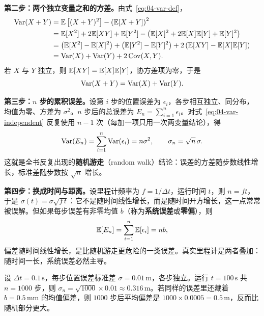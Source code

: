 \textbf{第二步：两个独立变量之和的方差。}由式~\eqref{eq:04-var-def}，
\begin{align}
  \operatorname{Var}(X+Y)
  &= \mathbb{E}\left[(X+Y)^{2}\right] - \left(\mathbb{E}[X+Y]\right)^{2} \notag\\
  &= \mathbb{E}[X^{2}]+2\mathbb{E}[XY]+\mathbb{E}[Y^{2}]
     - \left(\mathbb{E}[X]^{2}+2\mathbb{E}[X]\mathbb{E}[Y]+\mathbb{E}[Y]^{2}\right) \notag\\
  &= \left(\mathbb{E}[X^{2}]-\mathbb{E}[X]^{2}\right) + \left(\mathbb{E}[Y^{2}]-\mathbb{E}[Y]^{2}\right)
     + 2\left(\mathbb{E}[XY]-\mathbb{E}[X]\mathbb{E}[Y]\right) \notag\\
  &= \operatorname{Var}(X)+\operatorname{Var}(Y)+2\operatorname{Cov}(X,Y).
  \label{eq:04-var-sum}
\end{align}
若 $X$ 与 $Y$ 独立，则 $\mathbb{E}[XY]=\mathbb{E}[X]\mathbb{E}[Y]$，协方差项为零，于是
\begin{equation}
  \operatorname{Var}(X+Y)=\operatorname{Var}(X)+\operatorname{Var}(Y).
  \label{eq:04-var-independent}
\end{equation}

\textbf{第三步：$n$ 步的累积误差。}设第 $i$ 步的位置误差为 $\epsilon_i$，各步相互独立、同分布，均值为零、方差为 $\sigma^{2}$。$n$ 步后的总误差为 $E_n=\sum_{i=1}^{n}\epsilon_i$。对式~\eqref{eq:04-var-independent} 反复使用 $n-1$ 次（每加一项只用一次两变量结论），得
\begin{equation}
  \operatorname{Var}(E_n) = \sum_{i=1}^{n}\operatorname{Var}(\epsilon_i) = n\sigma^{2},
  \qquad
  \sigma_{n} = \sqrt{n}\,\sigma.
  \label{eq:04-drift-var}
\end{equation}
这就是全书反复出现的\textbf{随机游走}（random walk）结论：误差的方差随步数线性增长，标准差随步数按 $\sqrt{n}$ 增长。

\textbf{第四步：换成时间与距离。}设里程计频率为 $f=1/\Delta t$，运行时间 $t$，则 $n=ft$，于是 $\sigma(t)=\sigma\sqrt{f\,t}$：它不是随时间线性增长，而是随时间开方增长，这一点常常被误解。但如果每步误差有非零均值 $b$（称为\textbf{系统误差}或\textbf{零偏}），则
\begin{equation}
  \mathbb{E}[E_n] = \sum_{i=1}^{n}\mathbb{E}[\epsilon_i] = nb,
  \label{eq:04-bias}
\end{equation}
偏差随时间线性增长，是比随机游走更危险的一类误差。真实里程计是两者叠加：随时间一长，系统误差必然主导。

\begin{example}
设 $\Delta t=0.1\,\mathrm{s}$，每步位置误差标准差 $\sigma=0.01\,\mathrm{m}$，各步独立。运行 $t=100\,\mathrm{s}$ 共 $n=1000$ 步，则 $\sigma_n=\sqrt{1000}\times0.01\approx0.316\,\mathrm{m}$。若同样的误差里还藏着 $b=0.5\,\mathrm{mm}$ 的均值偏差，则 $1000$ 步后平均偏差是 $1000\times0.0005=0.5\,\mathrm{m}$，反而比随机部分更大。
\end{example}

